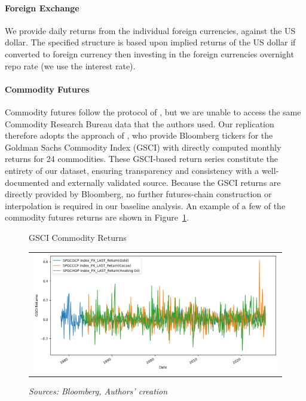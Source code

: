 \documentclass{article}
\begin{document}
\paragraph{Foreign Exchange}
We provide daily returns from the individual foreign currencies, against the US dollar. 
The specified structure is based upon implied returns of the US dollar if converted to foreign currency then investing 
in the foreign currencies overnight repo rate (we use the interest rate).


\paragraph{Commodity Futures}
Commodity futures follow the protocol of \cite{Yang2013}, but we are unable
to access the same Commodity Research Bureau data that the authors used. 
Our replication therefore adopts the approach of
\cite{Koijen2018}, who provide Bloomberg tickers for the Goldman Sachs
Commodity Index (GSCI) with directly computed monthly returns for 24 commodities.
These GSCI-based return series constitute the entirety of our dataset, ensuring
transparency and consistency with a well-documented and externally validated
source. Because the GSCI returns are directly provided by Bloomberg, no further
futures-chain construction or interpolation is required in our baseline analysis.
An example of a few of the commodity futures returns are shown in Figure~\ref{fig:gsci_commodity_returns}.

\begin{figure}[h]
    \centering
    \caption{GSCI Commodity Returns}
  \begin{tabular}{@{}c@{}}
    \includegraphics[width=.95\linewidth]{../docs_src/commod_gsci_return.png}
  \end{tabular}
  \caption*{\emph{Sources: Bloomberg, Authors' creation}}
  \label{fig:gsci_commodity_returns}
\end{figure}
\end{document}
